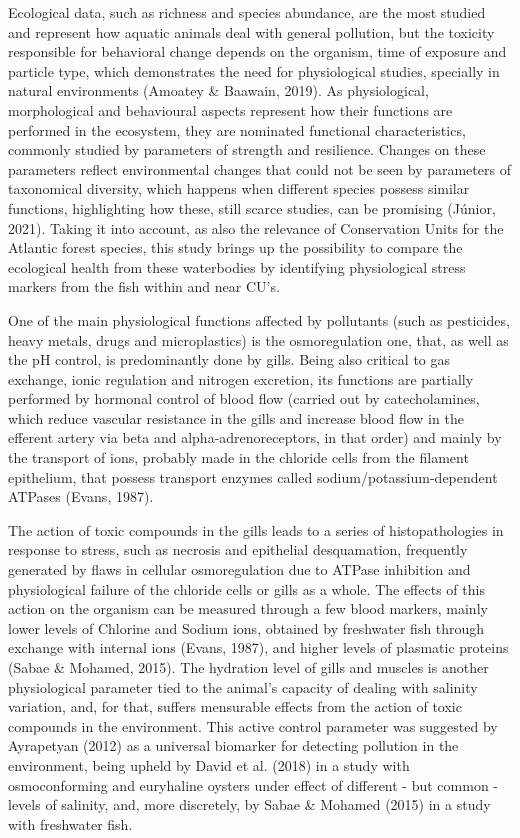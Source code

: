 \documentclass[
  american,
  letterpaper,
  DIV=11,
  numbers=noendperiod]{scrartcl}
\begin{document}
Ecological data, such as richness and species abundance, are the most
studied and represent how aquatic animals deal with general pollution,
but the toxicity responsible for behavioral change depends on the
organism, time of exposure and particle type, which demonstrates the
need for physiological studies, specially in natural environments
(Amoatey \& Baawain, 2019). As physiological, morphological and
behavioural aspects represent how their functions are performed in the
ecosystem, they are nominated functional characteristics, commonly
studied by parameters of strength and resilience. Changes on these
parameters reflect environmental changes that could not be seen by
parameters of taxonomical diversity, which happens when different
species possess similar functions, highlighting how these, still scarce
studies, can be promising (Júnior, 2021). Taking it into account, as
also the relevance of Conservation Units for the Atlantic forest
species, this study brings up the possibility to compare the ecological
health from these waterbodies by identifying physiological stress
markers from the fish within and near CU's.

One of the main physiological functions affected by pollutants (such as
pesticides, heavy metals, drugs and microplastics) is the osmoregulation
one, that, as well as the pH control, is predominantly done by gills.
Being also critical to gas exchange, ionic regulation and nitrogen
excretion, its functions are partially performed by hormonal control of
blood flow (carried out by catecholamines, which reduce vascular
resistance in the gills and increase blood flow in the efferent artery
via beta and alpha-adrenoreceptors, in that order) and mainly by the
transport of ions, probably made in the chloride cells from the filament
epithelium, that possess transport enzymes called
sodium/potassium-dependent ATPases (Evans, 1987).

The action of toxic compounds in the gills leads to a series of
histopathologies in response to stress, such as necrosis and epithelial
desquamation, frequently generated by flaws in cellular osmoregulation
due to ATPase inhibition and physiological failure of the chloride cells
or gills as a whole. The effects of this action on the organism can be
measured through a few blood markers, mainly lower levels of Chlorine
and Sodium ions, obtained by freshwater fish through exchange with
internal ions (Evans, 1987), and higher levels of plasmatic proteins
(Sabae \& Mohamed, 2015). The hydration level of gills and muscles is
another physiological parameter tied to the animal's capacity of dealing
with salinity variation, and, for that, suffers mensurable effects from
the action of toxic compounds in the environment. This active control
parameter was suggested by Ayrapetyan (2012) as a universal biomarker
for detecting pollution in the environment, being upheld by David et al.
(2018) in a study with osmoconforming and euryhaline oysters under
effect of different - but common - levels of salinity, and, more
discretely, by Sabae \& Mohamed (2015) in a study with freshwater fish.
\end{document}
